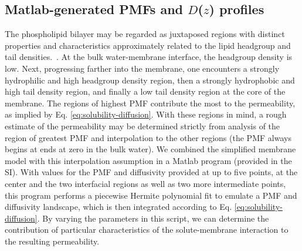   \subsection*{Matlab-generated PMFs and $D$($z$) profiles}
    \par The phospholipid bilayer may be regarded as juxtaposed regions with distinct properties and characteristics approximately related to the lipid headgroup and tail densities.~\cite{Marrink1994}. At the bulk water-membrane interface, the headgroup density is low. Next, progressing farther into the membrane, one encounters a strongly hydrophilic and high headgroup density region, then a strongly hydrophobic and high tail density region, and finally a low tail density region at the core of the membrane. The regions of highest PMF contribute the most to the permeability, as implied by Eq. \ref{eq:solubility-diffusion}. With these regions in mind, a rough estimate of the permeability may be determined strictly from analysis of the region of greatest PMF and interpolation to the other regions (the PMF always begins at ends at zero in the bulk water). We combined the simplified membrane model with this interpolation assumption in a Matlab program (provided in the SI). With values for the PMF and diffusivity provided at up to five points, at the center and the two interfacial regions as well as two more intermediate points, this program performs a piecewise Hermite polynomial fit to emulate a PMF and diffusivity landscape, which is then integrated according to Eq. \ref{eq:solubility-diffusion}. By varying the parameters in this script, we can determine the contribution of particular characteristics of the solute-membrane interaction to the resulting permeability.

